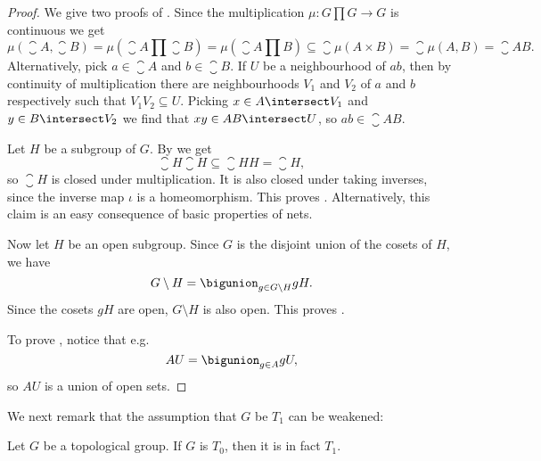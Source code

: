 \documentclass[article, a4paper, 11pt, oneside]{memoir}
\numberwithin{equation}{chapter}
\begin{document}
\begin{proof}
    We give two proofs of . Since the multiplication $\mu \colon G \prod G \to G$ is continuous we get
    \begin{equation*}
        \mu(\closure{A}, \closure{B})
            = \mu(\closure{A} \prod \closure{B})
            = \mu(\closure{A \prod B})
            \subseteq \closure{\mu(A \times B)}
            = \closure{\mu(A, B)}
            = \closure{AB}.
    \end{equation*}
    Alternatively, pick $a \in \closure{A}$ and $b \in \closure{B}$. If $U$ be a neighbourhood of $ab$, then by continuity of multiplication there are neighbourhoods $V_1$ and $V_2$ of $a$ and $b$ respectively such that $V_1 V_2 \subseteq U$. Picking $x \in A \intersect V_1$ and $y \in B \intersect V_2$ we find that $xy \in AB \intersect U$, so $ab \in \closure{AB}$.

    Let $H$ be a subgroup of $G$. By  we get
    \begin{equation*}
        \closure{H} \closure{H} \subseteq \closure{HH} = \closure{H},
    \end{equation*}
    so $\closure{H}$ is closed under multiplication. It is also closed under taking inverses, since the inverse map $\iota$ is a homeomorphism. This proves . Alternatively, this claim is an easy consequence of basic properties of nets.

    Now let $H$ be an open subgroup. Since $G$ is the disjoint union of the cosets of $H$, we have
    \begin{equation*}
        G \setminus H
            = \bigunion_{g \in G \setminus H} gH.
    \end{equation*}
    Since the cosets $gH$ are open, $G \setminus H$ is also open. This proves .

    To prove , notice that e.g.
    \begin{equation*}
        AU = \bigunion_{g \in A} gU,
    \end{equation*}
    so $AU$ is a union of open sets.
\end{proof}

We next remark that the assumption that $G$ be $T_1$ can be weakened:

\begin{proposition}[$T_0$ implies $T_1$]
    \label{thm:T0_implies_T1}
    Let $G$ be a topological group. If $G$ is $T_0$, then it is in fact $T_1$.
\end{proposition}
\end{document}
